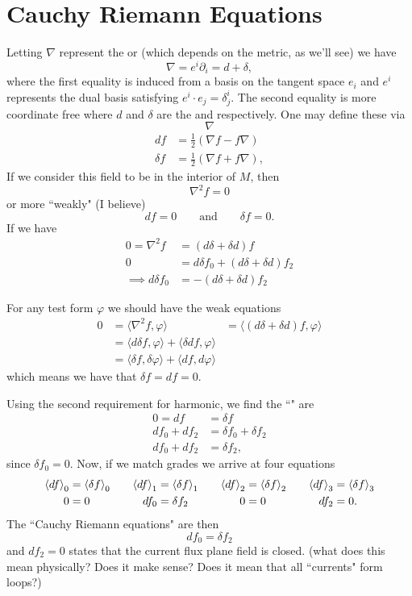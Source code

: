 \section{Cauchy Riemann Equations}

Letting $\nabla$ represent the  or  (which depends on the metric, as we'll see) we have
\[
\nabla = e^i \partial_i = d + \delta,
\]
where the first equality is induced from a basis on the tangent space $e_i$ and $e^i$ represents the dual basis satisfying $e^i \cdot e_j = \delta^i_j$. The second equality is more coordinate free where $d$ and $\delta$ are the  and  respectively. One may define these via
\[
\nabla
\]
\begin{align*}
df &= \frac{1}{2}\left( \nabla f - f\nabla\right)\\
\delta f &= \frac{1}{2} \left( \nabla f + f\nabla\right),
\end{align*}
If we consider this field to be  in the interior of $M$, then
\[
\nabla^2 f =0 
\]
or more ``weakly" (I believe)
\[
d f =0 \qquad \textrm{and} \qquad \delta f = 0.
\]
If we have 
\begin{align*}
    0=\nabla^2 f &= (d\delta +\delta d) f\\
    0&= d\delta f_0 + (d\delta + \delta d)f_2\\
    \implies d\delta f_0 &= -(d\delta + \delta d)f_2
\end{align*}

For any test form $\varphi$ we should have the weak equations
\begin{align*}
    0&=\langle \nabla^2 f, \varphi\rangle &= \langle (d\delta + \delta d)f,\varphi \rangle\\
    &= \langle d \delta f, \varphi\rangle + \langle \delta d f, \varphi \rangle \\
    &= \langle \delta f, \delta \varphi \rangle + \langle df,d\varphi\rangle
\end{align*}
which means we have that $\delta f=df=0$.

Using the second requirement for harmonic, we find the ``" are
\begin{align*}
    0=df&=\delta f\\
    df_0 + df_2 &= \delta f_0 + \delta f_2\\
    df_0 + df_2 &= \delta f_2,
\end{align*}
since $\delta f_0=0$.  Now, if we match grades we arrive at four equations
\begin{align*}
    \left\langle df\right\rangle_0&=\left\langle\delta f\right\rangle_0 &&& \left\langle df\right\rangle_1&=\left\langle\delta f\right\rangle_1 &&& \left\langle df\right\rangle_2&= \left\langle\delta f\right\rangle_2 &&& \left\langle df\right\rangle_3&= \left\langle\delta f\right\rangle_3\\
    0 &= 0 &&& df_0 &= \delta f_2 &&& 0&=0 &&& df_2 &= 0.
\end{align*}
The ``Cauchy Riemann equations" are then
\[
df_0= \delta f_2
\]
and $df_2 =0$ states that the current flux plane field is closed. (what does this mean physically? Does it make sense? Does it mean that all ``currents" form loops?) 

